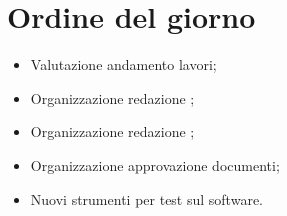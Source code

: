 \documentclass[../verbale-2017-03-31.tex]{subfiles}
\begin{document}
	
\section{Ordine del giorno}
	\begin{itemize}
		\item Valutazione andamento lavori;
		\item Organizzazione redazione \manualeutente;
		\item Organizzazione redazione \manualesviluppatore;
		\item Organizzazione approvazione documenti;
		\item Nuovi strumenti per test sul software.
	\end{itemize}
	
\end{document}

